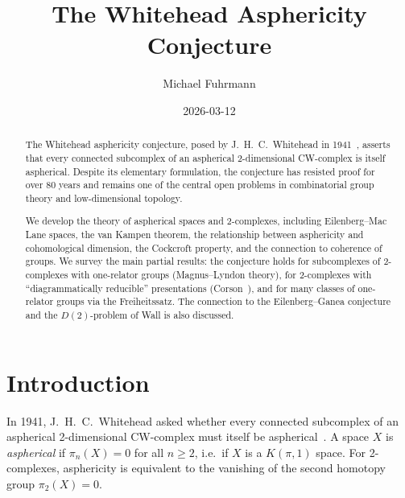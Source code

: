 \documentclass[12pt,a4paper]{amsart}
\theoremstyle{definition}
\theoremstyle{remark}
\begin{document}
\begin{abstract}
The Whitehead asphericity conjecture, posed by J.~H.~C.~Whitehead in
1941~\cite{Whitehead1941}, asserts that every connected subcomplex of an
aspherical 2-dimensional CW-complex is itself aspherical. Despite its
elementary formulation, the conjecture has resisted proof for over 80 years
and remains one of the central open problems in combinatorial group theory
and low-dimensional topology.

We develop the theory of aspherical spaces and 2-complexes, including
Eilenberg--Mac Lane spaces, the van Kampen theorem, the relationship
between asphericity and cohomological dimension, the Cockcroft property,
and the connection to coherence of groups. We survey the main partial
results: the conjecture holds for subcomplexes of 2-complexes with
one-relator groups (Magnus--Lyndon theory), for 2-complexes with
``diagrammatically reducible'' presentations (Corson~\cite{Corson1992}),
and for many classes of one-relator groups via the Freiheitssatz.
The connection to the Eilenberg--Ganea conjecture and the
$D(2)$-problem of Wall is also discussed.
\end{abstract}

\title{The Whitehead Asphericity Conjecture}
\author{Michael Fuhrmann}
\address{Specialist Mathematics Project, Build 165}
\date{2026-03-12}

\maketitle

\section{Introduction}

In 1941, J.~H.~C.~Whitehead asked whether every connected subcomplex of
an aspherical 2-dimensional CW-complex must itself be aspherical~\cite{Whitehead1941}.
A space $X$ is \emph{aspherical} if $\pi_n(X) = 0$ for all $n \geq 2$,
i.e.\ if $X$ is a $K(\pi,1)$ space. For 2-complexes, asphericity is
equivalent to the vanishing of the second homotopy group $\pi_2(X) = 0$.
\end{document}

